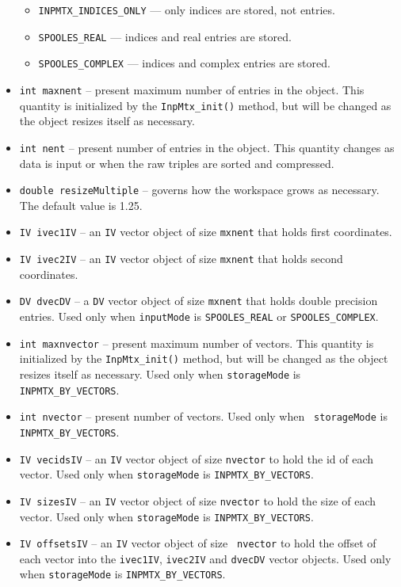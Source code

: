 \begin{itemize}
\begin{itemize}
\item {\tt INPMTX\_INDICES\_ONLY} 
--- only indices are stored, not entries.
\item {\tt SPOOLES\_REAL} 
--- indices and real entries are stored.
\item {\tt SPOOLES\_COMPLEX} 
--- indices and complex entries are stored.
\end{itemize}
\item
{\tt int maxnent} -- present maximum number of entries in the object.
This quantity is initialized by the {\tt InpMtx\_init()} method,
but will be changed as the object resizes itself as necessary. 
\item
{\tt int nent} -- present number of entries in the object.
This quantity changes as data is input or when the raw triples are
sorted and compressed.
\item
{\tt double resizeMultiple} -- governs how the workspace grows as
necessary. The default value is 1.25.
\item
{\tt IV ivec1IV} -- an {\tt IV} vector object 
of size {\tt mxnent} that holds first coordinates.
\item
{\tt IV ivec2IV} -- an {\tt IV} vector object
of size {\tt mxnent} that holds second coordinates.
\item
{\tt DV dvecDV} -- a {\tt DV} vector object of size {\tt mxnent}
that holds double precision entries. Used only when {\tt inputMode} 
is {\tt SPOOLES\_REAL} or {\tt SPOOLES\_COMPLEX}.
\item
{\tt int maxnvector} -- present maximum number of vectors. 
This quantity is initialized by the {\tt InpMtx\_init()} method,
but will be changed as the object resizes itself as necessary. 
Used only when {\tt storageMode} is {\tt INPMTX\_BY\_VECTORS}.
\item
{\tt int nvector} -- present number of vectors. Used only when {\tt
storageMode} is {\tt INPMTX\_BY\_VECTORS}.
\item
{\tt IV vecidsIV} -- an {\tt IV} vector object of size {\tt nvector} 
to hold the id of each vector. 
Used only when {\tt storageMode} is {\tt INPMTX\_BY\_VECTORS}.
\item
{\tt IV sizesIV} -- an {\tt IV} vector object of size {\tt nvector} 
to hold the size of each vector. 
Used only when {\tt storageMode} is {\tt INPMTX\_BY\_VECTORS}.
\item
{\tt IV offsetsIV} -- an {\tt IV} vector object of size {\tt
nvector} to hold the offset of each vector into the {\tt ivec1IV},
{\tt ivec2IV} and {\tt dvecDV} vector objects.
Used only when {\tt storageMode} is {\tt INPMTX\_BY\_VECTORS}.
\end{itemize}
